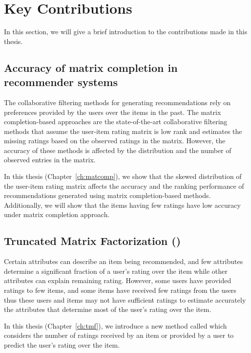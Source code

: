 
\section{Key Contributions}
\label{ch:intro:contr}

In this section, we will give a brief introduction to the contributions made in this thesis. 


\subsection{Accuracy of matrix completion in recommender systems}
The collaborative filtering methods for generating recommendations rely on preferences
provided by the users over the items in the past. The matrix completion-based approaches
are the state-of-the-art collaborative filtering methods that assume the user-item
rating matrix is low rank and estimates the missing ratings based on the observed
ratings in the matrix. However, the accuracy of these methods is affected by the
distribution and the number of observed entries in the matrix.  

In this thesis (Chapter~\ref{ch:matcomp}), we show that the skewed distribution of the
user-item rating matrix affects the accuracy and the ranking performance of
recommendations generated using matrix completion-based methods. Additionally, we will
show that the items having few ratings have low accuracy under matrix completion approach.


\subsection{Truncated Matrix Factorization  (\TMF)}
Certain attributes can describe an item being recommended, and few attributes
determine a significant fraction of a user's rating over the item while other
attributes can explain remaining rating. However, some users have provided ratings
to few items, and some items have received few ratings from the users thus these
users and items may not have sufficient ratings to estimate accurately the
attributes that determine most of the user's rating over the item.

In this thesis (Chapter~\ref{ch:tmf}), we introduce a new method called \TMF
which considers the number of ratings received by an item or provided by a user to predict the user's rating over the item. 


